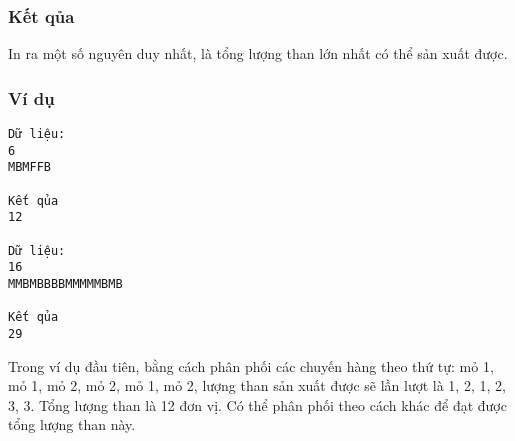 \subsubsection{   Kết qủa  }

   In ra một số nguyên duy nhất, là tổng lượng than lớn nhất có thể sản xuất được.  

\subsubsection{   Ví dụ  }
\begin{verbatim}
Dữ liệu:
6
MBMFFB

Kết qủa
12

Dữ liệu:
16
MMBMBBBBMMMMMBMB

Kết qủa
29
\end{verbatim}

   Trong ví dụ đầu tiên, bằng cách phân phối các chuyến hàng theo thứ tự: mỏ 1, mỏ 1, mỏ 2, mỏ 2, mỏ 1, mỏ 2, lượng than sản xuất được sẽ lần lượt là 1, 2, 1, 2, 3, 3. Tổng lượng than là 12 đơn vị. Có thể phân phối theo cách khác để đạt được tổng lượng than này.  